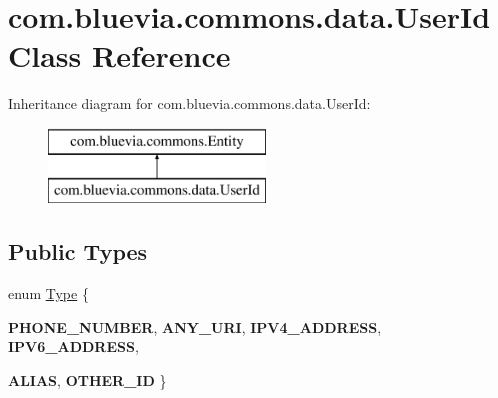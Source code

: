 \hypertarget{classcom_1_1bluevia_1_1commons_1_1data_1_1UserId}{
\section{com.bluevia.commons.data.UserId Class Reference}
\label{classcom_1_1bluevia_1_1commons_1_1data_1_1UserId}
}
Inheritance diagram for com.bluevia.commons.data.UserId:\begin{figure}[H]
\begin{center}
\leavevmode
\includegraphics[height=2.000000cm]{classcom_1_1bluevia_1_1commons_1_1data_1_1UserId}
\end{center}
\end{figure}
\subsection*{Public Types}
\begin{DoxyCompactItemize}
\item 
enum \hyperlink{classcom_1_1bluevia_1_1commons_1_1data_1_1UserId_a159e600181e6a14e769bb0a86f2c981a}{Type} \{ \par
{\bfseries PHONE\_\-NUMBER}, 
{\bfseries ANY\_\-URI}, 
{\bfseries IPV4\_\-ADDRESS}, 
{\bfseries IPV6\_\-ADDRESS}, 
\par
{\bfseries ALIAS}, 
{\bfseries OTHER\_\-ID}
 \}
\end{DoxyCompactItemize}
